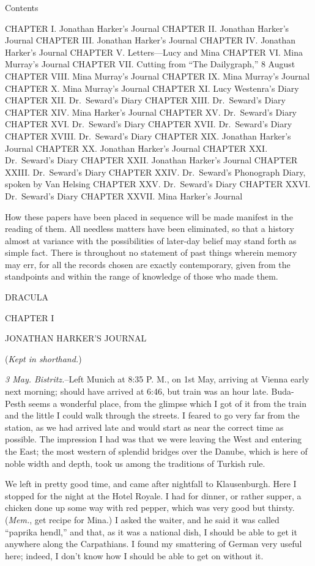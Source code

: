 \documentclass[12pt,openright]{book}
\begin{document}
Contents

CHAPTER I. Jonathan Harker’s Journal CHAPTER II. Jonathan Harker’s Journal CHAPTER III. Jonathan Harker’s Journal CHAPTER IV. Jonathan Harker’s Journal CHAPTER V. Letters—Lucy and Mina CHAPTER VI. Mina Murray’s Journal CHAPTER VII. Cutting from “The Dailygraph,” 8 August CHAPTER VIII. Mina Murray’s Journal CHAPTER IX. Mina Murray’s Journal CHAPTER X. Mina Murray’s Journal CHAPTER XI. Lucy Westenra’s Diary CHAPTER XII. Dr. Seward’s Diary CHAPTER XIII. Dr. Seward’s Diary CHAPTER XIV. Mina Harker’s Journal CHAPTER XV. Dr. Seward’s Diary CHAPTER XVI. Dr. Seward’s Diary CHAPTER XVII. Dr. Seward’s Diary CHAPTER XVIII. Dr. Seward’s Diary CHAPTER XIX. Jonathan Harker’s Journal CHAPTER XX. Jonathan Harker’s Journal CHAPTER XXI. Dr. Seward’s Diary CHAPTER XXII. Jonathan Harker’s Journal CHAPTER XXIII. Dr. Seward’s Diary CHAPTER XXIV. Dr. Seward’s Phonograph Diary, spoken by Van Helsing CHAPTER XXV. Dr. Seward’s Diary CHAPTER XXVI. Dr. Seward’s Diary CHAPTER XXVII. Mina Harker’s Journal

How these papers have been placed in sequence will be made manifest in the reading of them. All needless matters have been eliminated, so that a history almost at variance with the possibilities of later-day belief may stand forth as simple fact. There is throughout no statement of past things wherein memory may err, for all the records chosen are exactly contemporary, given from the standpoints and within the range of knowledge of those who made them.

DRACULA

CHAPTER I

JONATHAN HARKER’S JOURNAL

(\textit{Kept in shorthand.})

\textit{3 May. Bistritz.}–Left Munich at 8:35 P. M., on 1st May, arriving at Vienna early next morning; should have arrived at 6:46, but train was an hour late. Buda-Pesth seems a wonderful place, from the glimpse which I got of it from the train and the little I could walk through the streets. I feared to go very far from the station, as we had arrived late and would start as near the correct time as possible. The impression I had was that we were leaving the West and entering the East; the most western of splendid bridges over the Danube, which is here of noble width and depth, took us among the traditions of Turkish rule.

We left in pretty good time, and came after nightfall to Klausenburgh. Here I stopped for the night at the Hotel Royale. I had for dinner, or rather supper, a chicken done up some way with red pepper, which was very good but thirsty. (\textit{Mem.}, get recipe for Mina.) I asked the waiter, and he said it was called “paprika hendl,” and that, as it was a national dish, I should be able to get it anywhere along the Carpathians. I found my smattering of German very useful here; indeed, I don’t know how I should be able to get on without it.
\end{document}
